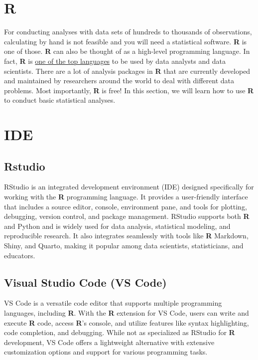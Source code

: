 \documentclass[
  letterpaper,
  DIV=11,
  numbers=noendperiod]{scrreprt}
\begin{document}
\section{R}\label{r}

For conducting analyses with data sets of hundreds to thousands of
observations, calculating by hand is not feasible and you will need a
statistical software. \textbf{R} is one of those. \textbf{R} can also be
thought of as a high-level programming language. In fact, \textbf{R} is
\href{https://statisticstimes.com/tech/top-computer-languages.php}{one
of the top languages} to be used by data analysts and data scientists.
There are a lot of analysis packages in \textbf{R} that are currently
developed and maintained by researchers around the world to deal with
different data problems. Most importantly, \textbf{R} is free! In this
section, we will learn how to use \textbf{R} to conduct basic
statistical analyses.

\section{IDE}\label{ide}

\subsection{Rstudio}\label{rstudio}

RStudio is an integrated development environment (IDE) designed
specifically for working with the \textbf{R} programming language. It
provides a user-friendly interface that includes a source editor,
console, environment pane, and tools for plotting, debugging, version
control, and package management. RStudio supports both \textbf{R} and
Python and is widely used for data analysis, statistical modeling, and
reproducible research. It also integrates seamlessly with tools like
\textbf{R} Markdown, Shiny, and Quarto, making it popular among data
scientists, statisticians, and educators.

\subsection{Visual Studio Code (VS
Code)}\label{visual-studio-code-vs-code}

VS Code is a versatile code editor that supports multiple programming
languages, including \textbf{R}. With the \textbf{R} extension for VS
Code, users can write and execute \textbf{R} code, access \textbf{R}'s
console, and utilize features like syntax highlighting, code completion,
and debugging. While not as specialized as RStudio for \textbf{R}
development, VS Code offers a lightweight alternative with extensive
customization options and support for various programming tasks.
\end{document}
